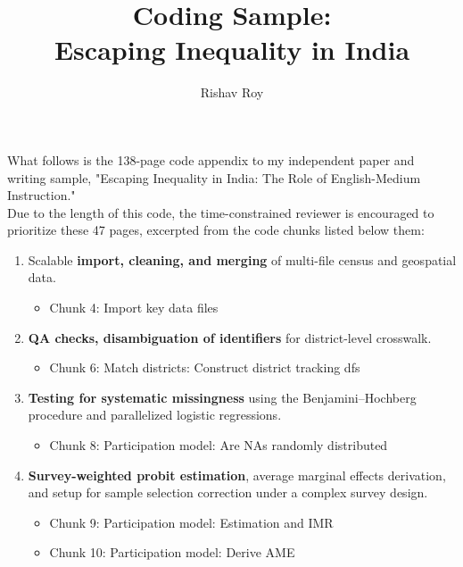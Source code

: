 \documentclass[letterpaper,12pt]{article}
\title{Coding Sample: \\ Escaping Inequality in India\vspace{-2mm}}
\author{Rishav Roy}
\date{}
\begin{document}
\maketitle
\vspace{-3mm}
\noindent What follows is the 138-page code appendix to my independent paper and writing sample, "Escaping Inequality in India: The Role of English-Medium Instruction." \\

\vspace{-2mm}
\noindent Due to the length of this code, the time-constrained reviewer is encouraged to prioritize these 47 pages, excerpted from the code chunks listed below them: 

\begin{enumerate}
\item[14-16:] Scalable \textbf{import, cleaning, and merging} of multi-file census and geospatial data.
\vspace{-2mm}
\begin{itemize}
\item Chunk 4: Import key data files
\end{itemize}
\vspace{-2mm}

\item[31-32:] \textbf{QA checks, disambiguation of identifiers} for district-level crosswalk.
\vspace{-2mm}
\begin{itemize}
\item Chunk 6: Match districts: Construct district tracking dfs
\end{itemize}
\vspace{-2mm}

\item[50-52:] \textbf{Testing for systematic missingness} using the Benjamini–Hochberg procedure and parallelized logistic regressions. 
\vspace{-2mm}
\begin{itemize}
\item Chunk 8: Participation model: Are NAs randomly distributed
\end{itemize}
\vspace{-2mm}

\item[55-57:] \textbf{Survey-weighted probit estimation}, average marginal effects derivation, and setup for sample selection correction under a complex survey design.
\vspace{-2mm}
\begin{itemize}
\item Chunk 9: Participation model: Estimation and IMR 
\vspace{-1mm}
\item Chunk 10: Participation model: Derive AME
\end{itemize}
\vspace{-2mm}


\end{enumerate}
\end{document}
